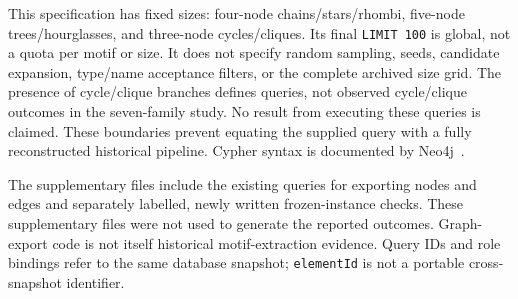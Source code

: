 This specification has fixed sizes: four-node chains/stars/rhombi, five-node trees/hourglasses, and three-node cycles/cliques. Its final \texttt{LIMIT 100} is global, not a quota per motif or size. It does not specify random sampling, seeds, candidate expansion, type/name acceptance filters, or the complete archived size grid. The presence of cycle/clique branches defines queries, not observed cycle/clique outcomes in the seven-family study. No result from executing these queries is claimed. These boundaries prevent equating the supplied query with a fully reconstructed historical pipeline. Cypher syntax is documented by Neo4j~\cite{neo4jCypher}.



The supplementary files include the existing queries for exporting nodes and edges and separately labelled, newly written frozen-instance checks. These supplementary files were not used to generate the reported outcomes. Graph-export code is not itself historical motif-extraction evidence. Query IDs and role bindings refer to the same database snapshot; \texttt{elementId} is not a portable cross-snapshot identifier.


